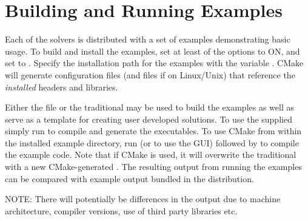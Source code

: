 \section{Building and Running Examples}
Each of the {\sundials} solvers is distributed with a set of examples
demonstrating basic usage. To build and install the examples, set at
least of the  options to ON, and
set  to .
Specify the installation path for the examples with the variable . CMake will generate
 configuration files (and  files if on Linux/Unix) that reference the
{\em installed} {\sundials} headers and libraries.

Either the  file or the traditional  may be used to build the examples
as well as serve as a template for creating user developed solutions.
To use the supplied  simply run  to compile and generate the executables.
To use CMake from within the installed example directory, run  (or  to use the GUI)
followed by  to compile the example code.
Note that if CMake is used, it will overwrite the traditional  with a new CMake-generated .
The resulting output from running the examples can be compared with example output bundled
in the {\sundials} distribution.

\noindent NOTE: There will potentially be differences in the output due to machine architecture, compiler versions,
use of third party libraries etc.{\warn} 


